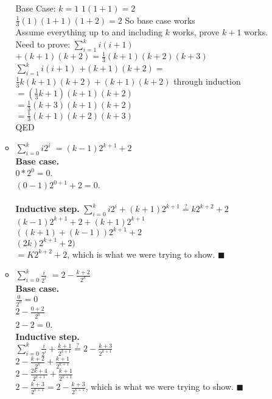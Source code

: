\documentclass[12pt]{article}
\begin{document}
\begin{enumerate}
\begin{itemize}
Base Case: $k=1$
$1(1+1) = 2$\\
$\frac{1}{3}(1)(1+1)(1+2) = 2$ So base case works\\

Assume everything up to and including $k$ works, prove $k+1$ works.\\
Need to prove: $\displaystyle\sum\limits_{i=1}^k i(i+1)$ $+(k+1)(k+2) =
\frac{1}{3}(k+1)(k+2)(k+3)$\\
$\displaystyle\sum\limits_{i=1}^k i(i+1)$ $+(k+1)(k+2) =$\\
$\frac{1}{3}k(k+1)(k+2)+(k+1)(k+2)$ through induction\\
$= (\frac{1}{3}k+1)(k+1)(k+2)$\\
$= \frac{1}{3}(k+3)(k+1)(k+2)$\\
$= \frac{1}{3}(k+1)(k+2)(k+3)$\\
QED
\item $\displaystyle\sum\limits_{i=0}^k i2^i $ $= (k-1)2^{k+1}+2$ \\

  \textbf{Base case.} \\ 
    $0 * 2^0 = 0$. \\
    $(0 - 1)2^{0 + 1} + 2 = 0$. \\ \\
  \textbf{Inductive step.}
    $\sum_{i=0}^k i2^i + (k + 1)2^{k+1} \stackrel{?}{=} k2^{k+2} + 2$ \\
    $(k - 1)2^{k+1} + 2 + (k + 1)2^{k+1}$ \\
    $((k + 1) + (k - 1))2^{k+1} + 2$ \\
    $(2k)2^{k+1}+2)$ \\
    $= K2^{k+2} + 2$, which is what we were trying to show. $\blacksquare$

\item $\displaystyle\sum\limits_{i=0}^k \frac{i}{2^i} $ $= 2-\frac{k+2}{2^k}$ \\

  \textbf{Base case.} \\
    $\frac{0}{2^0} = 0$ \\
    $2 - \frac{0 + 2}{2^0}$ \\
    $2 - 2 = 0$.\\

  \textbf{Inductive step.} \\
    $\displaystyle \sum_{i=0}^k \frac{i}{2^i} + \frac{k+1}{2^{k+1}} \stackrel{?}{=} 2 - \frac{k+3}{2^{k + 1}}$ \\
    $\displaystyle 2 - \frac{k+2}{2^k} + \frac{k+1}{2^{k+1}}$\\
    $\displaystyle 2 - \frac{2k+4}{2^{k+1}} + \frac{k+1}{2^{k+1}}$\\
    $\displaystyle 2 - \frac{k+3}{2^{k+1}} = 2 - \frac{k+3}{2^{k+1}}$, which is what we were trying to show. $\blacksquare$


\end{itemize}
\end{enumerate}
\end{document}
